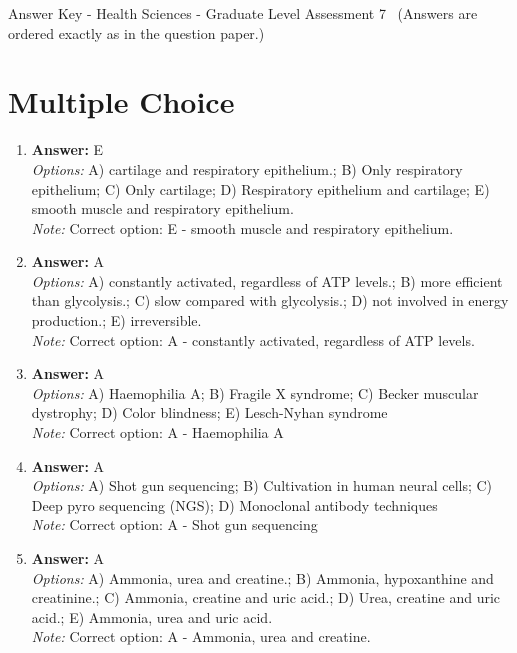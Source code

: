 \documentclass[12pt]{article}
\begin{document}
\begin{center}
Answer Key - Health Sciences - Graduate Level Assessment 7 \
\small (Answers are ordered exactly as in the question paper.)
\end{center}

\section*{Multiple Choice}
\begin{enumerate}[label=\arabic*.]
\item \textbf{Answer:} E
\\ \textit{Options:} A) cartilage and respiratory epithelium.; B) Only respiratory epithelium; C) Only cartilage; D) Respiratory epithelium and cartilage; E) smooth muscle and respiratory epithelium.
\\ \textit{Note:} Correct option: E - smooth muscle and respiratory epithelium.
\item \textbf{Answer:} A
\\ \textit{Options:} A) constantly activated, regardless of ATP levels.; B) more efficient than glycolysis.; C) slow compared with glycolysis.; D) not involved in energy production.; E) irreversible.
\\ \textit{Note:} Correct option: A - constantly activated, regardless of ATP levels.
\item \textbf{Answer:} A
\\ \textit{Options:} A) Haemophilia A; B) Fragile X syndrome; C) Becker muscular dystrophy; D) Color blindness; E) Lesch-Nyhan syndrome
\\ \textit{Note:} Correct option: A - Haemophilia A
\item \textbf{Answer:} A
\\ \textit{Options:} A) Shot gun sequencing; B) Cultivation in human neural cells; C) Deep pyro sequencing (NGS); D) Monoclonal antibody techniques
\\ \textit{Note:} Correct option: A - Shot gun sequencing
\item \textbf{Answer:} A
\\ \textit{Options:} A) Ammonia, urea and creatine.; B) Ammonia, hypoxanthine and creatinine.; C) Ammonia, creatine and uric acid.; D) Urea, creatine and uric acid.; E) Ammonia, urea and uric acid.
\\ \textit{Note:} Correct option: A - Ammonia, urea and creatine.
\end{enumerate}
\end{document}
